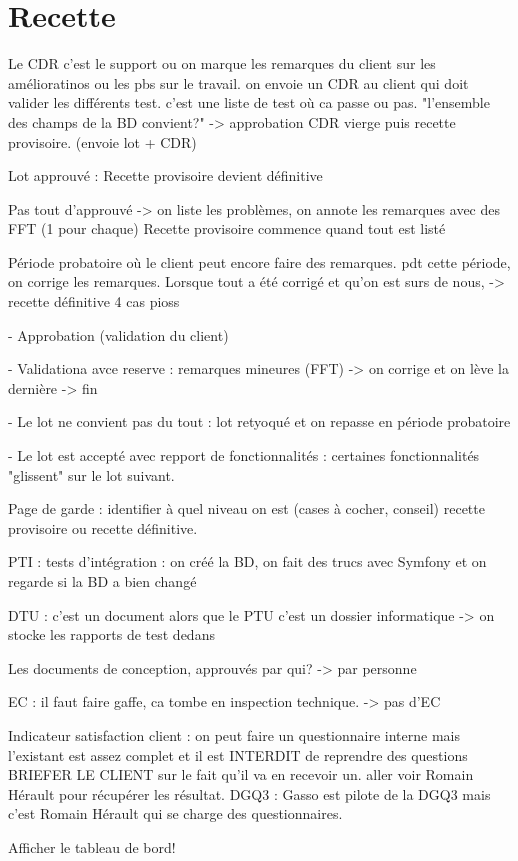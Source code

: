 \documentclass [a4paper] {article}
\begin{document}
\section{Recette}
Le CDR c'est le support ou on marque les remarques du client sur les amélioratinos ou les pbs sur le travail.
on envoie un CDR au client qui doit valider les différents test. c'est une liste de test où ca passe ou pas. "l'ensemble des champs de la BD convient?" -> approbation CDR vierge puis recette provisoire. (envoie lot + CDR)

Lot approuvé : Recette provisoire devient définitive

Pas tout d'approuvé -> on liste les problèmes, on annote les remarques avec des FFT (1 pour chaque)		Recette provisoire commence quand tout est listé

Période probatoire où le client peut encore faire des remarques. pdt cette période, on corrige les remarques. Lorsque tout a été corrigé et qu'on est surs de nous, -> recette définitive 4 cas pioss


- Approbation (validation du client)

- Validationa avce reserve : remarques mineures (FFT) -> on corrige et on lève la dernière -> fin

- Le lot ne convient pas du tout : lot retyoqué et on repasse en période probatoire

- Le lot est accepté avec repport de fonctionnalités : certaines fonctionnalités "glissent" sur le lot suivant.


Page de garde : identifier à quel niveau on est (cases à cocher, conseil) recette provisoire ou recette définitive.



PTI : tests d'intégration : on créé la BD, on fait des trucs avec Symfony et on regarde si la BD a bien changé


DTU : c'est un document alors que le PTU c'est un dossier informatique -> on stocke les rapports de test dedans 


Les documents de conception, approuvés par qui? -> par personne


EC : il faut faire gaffe, ca tombe en inspection technique.  -> pas d'EC


Indicateur satisfaction client : on peut faire un questionnaire interne mais l'existant est assez complet et il est INTERDIT de reprendre des questions 	BRIEFER LE CLIENT sur le fait qu'il va en recevoir un. aller voir Romain Hérault pour récupérer les résultat.
DGQ3 : Gasso est pilote de la DGQ3 mais c'est Romain Hérault qui se charge des questionnaires.

Afficher le tableau de bord! 
\end{document}
